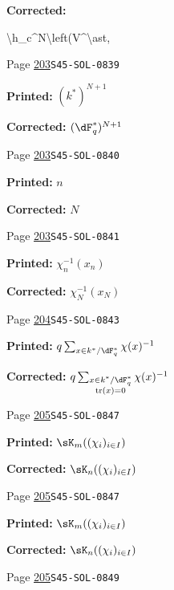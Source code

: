 \documentclass[oneside]{book}
\DeclareMathOperator{\tr}{tr}
\theoremstyle{sga-source}
\theoremstyle{sga-source-dash}
\theoremstyle{sga-source-dotdash}
\theoremstyle{sga-source-number-note-dash}
\theoremstyle{sga-source-note-number-dotdash}
\theoremstyle{sga-source-example-dotdash}
\theoremstyle{sga-source-inline-number}
\theoremstyle{sga-source-bare-number}
\theoremstyle{sga-source}
\begin{document}
\begin{description}
\par\noindent\textbf{Corrected:} {\footnotesize\ttfamily\raggedright \textbackslash{}\allowbreak{}h\_\allowbreak{}c\textasciicircum{}\allowbreak{}N\textbackslash{}\allowbreak{}left(\allowbreak{}V\textasciicircum{}\allowbreak{}\textbackslash{}\allowbreak{}ast,\allowbreak{}\par}
\smallskip
\item[\hypertarget{apparatus:EN-0139}{139}] Page \hyperlink{printpage:en:203}{203}\quad\texttt{S45-SOL-0839}
\par\noindent\textbf{Printed:} \((k^\ast)^{N+1}\)
\par\noindent\textbf{Corrected:} \((\dF_q^\ast)^{N+1}\)
\smallskip
\item[\hypertarget{apparatus:EN-0140}{140}] Page \hyperlink{printpage:en:203}{203}\quad\texttt{S45-SOL-0840}
\par\noindent\textbf{Printed:} \(n\)
\par\noindent\textbf{Corrected:} \(N\)
\smallskip
\item[\hypertarget{apparatus:EN-0141}{141}] Page \hyperlink{printpage:en:203}{203}\quad\texttt{S45-SOL-0841}
\par\noindent\textbf{Printed:} \(\chi_n^{-1}(x_n)\)
\par\noindent\textbf{Corrected:} \(\chi_N^{-1}(x_N)\)
\smallskip
\item[\hypertarget{apparatus:EN-0142}{142}] Page \hyperlink{printpage:en:204}{204}\quad\texttt{S45-SOL-0843}
\par\noindent\textbf{Printed:} \(q\sum_{x\in k^\ast/\dF_q^\ast} \chi(x)^{-1}\)
\par\noindent\textbf{Corrected:} \(q\sum_{\substack{x\in k^\ast/\dF_q^\ast\\\tr(x)=0}} \chi(x)^{-1}\)
\smallskip
\item[\hypertarget{apparatus:EN-0143}{143}] Page \hyperlink{printpage:en:205}{205}\quad\texttt{S45-SOL-0847}
\par\noindent\textbf{Printed:} \(\sK_m((\chi_i)_{i\in I})\)
\par\noindent\textbf{Corrected:} \(\sK_n((\chi_i)_{i\in I})\)
\smallskip
\item[\hypertarget{apparatus:EN-0144}{144}] Page \hyperlink{printpage:en:205}{205}\quad\texttt{S45-SOL-0847}
\par\noindent\textbf{Printed:} \(\sK_m((\chi_i)_{i\in I})\)
\par\noindent\textbf{Corrected:} \(\sK_n((\chi_i)_{i\in I})\)
\smallskip
\item[\hypertarget{apparatus:EN-0145}{145}] Page \hyperlink{printpage:en:205}{205}\quad\texttt{S45-SOL-0849}

\end{description}
\end{document}
